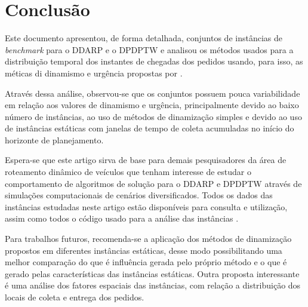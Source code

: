 \chapter{Conclusão}\label{ch:conclusao}


Este documento apresentou, de forma detalhada, conjuntos de instâncias de 
\textit{benchmark} para o DDARP e o DPDPTW e analisou os métodos usados para a 
distribuição temporal dos instantes de chegadas dos pedidos usando, para isso,
as méticas di dinamismo e urgência propostas por 
.

Através dessa análise, observou-se que os conjuntos possuem pouca 
variabilidade em relação aos valores de dinamismo e urgência, principalmente 
devido ao baixo número de instâncias, ao uso de métodos de dinamização simples 
e devido ao uso de instâncias estáticas com janelas de tempo de coleta
acumuladas no início do horizonte de planejamento.

Espera-se que este artigo sirva de base para demais pesquisadores da área de 
roteamento dinâmico de veículos que tenham interesse de estudar o comportamento
de algoritmos de solução para o DDARP e DPDPTW através de simulações 
computacionais de cenários diversificados.
Todos os dados das instâncias estudadas neste artigo estão disponíveis para 
consulta e utilização, assim como todos o código usado para a análise das 
instâncias \cite{eccel_problemas_2019}.

Para trabalhos futuros, recomenda-se a aplicação dos métodos de dinamização
propostos em diferentes instâncias estáticas, desse modo possibilitando uma
melhor comparação do que é influência gerada pelo próprio método e o que é 
gerado pelas características das instâncias estáticas.
Outra proposta interessante é uma análise dos fatores espaciais das 
instâncias, com relação a distribuição dos locais de coleta e entrega dos 
pedidos.
